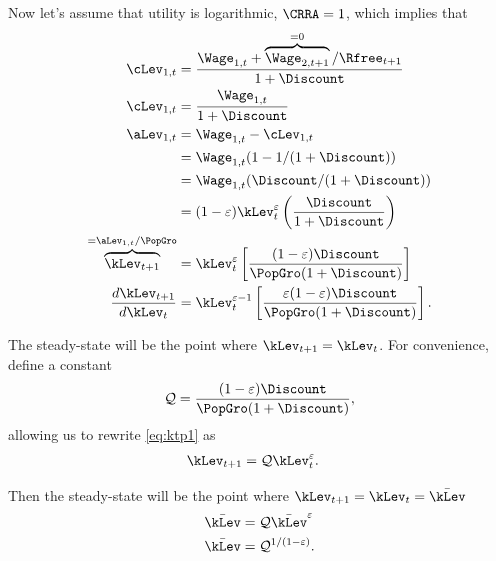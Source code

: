 \documentclass{handout}
\begin{document}
Now let's assume that utility is logarithmic, $\CRRA = 1$, which implies that 
\begin{equation}\begin{gathered}\begin{aligned}
        \cLev_{1,t} & =  \frac{\Wage_{1,t} + \overbrace{\Wage_{2,t+1}}^{=0}/\Rfree_{t+1}}{1+\Discount}  \\
        \cLev_{1,t} & =  \frac{\Wage_{1,t}}{1+\Discount} \\
        {\aLev}_{1,t} & =  \Wage_{1,t}-\cLev_{1,t}  \\
         & =  \Wage_{1,t}(1-1/(1+\Discount))  \\
         & =  \Wage_{1,t}(\Discount/(1+\Discount))
\\   & =  (1-\varepsilon) \kLev_{t}^{\varepsilon}\left(\frac{\Discount}{1+\Discount}\right)
\\  \overbrace{\kLev_{t+1}}^{={\aLev}_{1,t}/\PopGro} & =  \kLev_{t}^{\varepsilon}\left[\frac{(1-\varepsilon)\Discount}{\PopGro(1+\Discount)}\right] \label{eq:ktp1}
\\ \frac{d\kLev_{t+1}}{d\kLev_{t}} & =  \kLev_{t}^{\varepsilon-1}\left[\frac{\varepsilon (1-\varepsilon) \Discount}{\PopGro(1+\Discount)}\right].
\end{aligned}\end{gathered}\end{equation}

The steady-state will be the point where $\kLev_{t+1}=\kLev_{t}$.  For convenience,
define a constant
\[ \mathcal{Q} = \frac{(1-\varepsilon) \Discount}{\PopGro(1+\Discount)}, \]
allowing us to rewrite \eqref{eq:ktp1} as
\begin{equation}\begin{gathered}\begin{aligned}
        \kLev_{t+1} & =  \mathcal{Q} \kLev_{t}^{\varepsilon}.
\end{aligned}\end{gathered}\end{equation}

Then the steady-state will be the point where $\kLev_{t+1}=\kLev_{t}=\bar{\kLev}$
\begin{equation}\begin{gathered}\begin{aligned}
        \bar{\kLev} & =  \mathcal{Q} \bar{\kLev}^{\varepsilon}  \\
        \bar{\kLev} & =  \mathcal{Q}^{1/(1-\varepsilon)}.
\end{aligned}\end{gathered}\end{equation}
\end{document}
